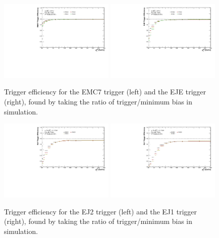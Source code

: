 \begin{figure}[hbt!]
    \centering
    \begin{multicols}{2}
            \includegraphics[width=0.49\textwidth]{figures/TriggerEfficiency/hEfficiency_EMC7.pdf}
        \vfill\null
        \columnbreak
            \includegraphics[width=0.49\textwidth]{figures/TriggerEfficiency/hEfficiency_EJE.pdf}
        \vfill\null
    \end{multicols}
    \caption{Trigger efficiency for the EMC7 trigger (left) and the EJE trigger (right), found by taking the ratio of trigger/minimum bias in \pp simulation.}
    \label{fig:TriggerEfficiency_pp}
\end{figure}

\begin{figure}[hbt!]
    \centering
    \begin{multicols}{2}
            \includegraphics[width=0.49\textwidth]{figures/pPbFigures/TriggerEfficiency/hEfficiency_EJ2.pdf}
        \vfill\null
        \columnbreak
            \includegraphics[width=0.49\textwidth]{figures/pPbFigures/TriggerEfficiency/hEfficiency_EJ1.pdf}
        \vfill\null
    \end{multicols}
    \caption{Trigger efficiency for the EJ2 trigger (left) and the EJ1 trigger (right), found by taking the ratio of trigger/minimum bias in \pPb simulation.}
    \label{fig:TriggerEfficiency_pPb}
\end{figure}